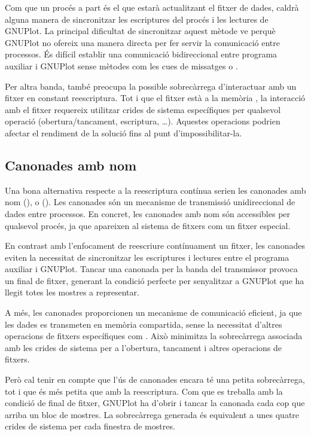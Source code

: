 \documentclass{tfgitic}[2023/07/07]
\begin{document}
Com que un procés a part és el que estarà actualitzant el fitxer de
dades, caldrà alguna manera de sincronitzar les escriptures del procés
i les lectures de GNUPlot. La principal dificultat de sincronitzar
aquest mètode ve perquè GNUPlot no ofereix una manera directa per fer
servir la comunicació entre processos. És difícil establir una
comunicació bidireccional entre programa auxiliar i GNUPlot sense
mètodes com les cues de missatges \cite{cues-missatges} o
  \cite{sockets-unix}.

Per altra banda, també preocupa la possible sobrecàrrega d'interactuar
amb un fitxer en constant reescriptura. Tot i que el fitxer està a la
memòria , la interacció amb el fitxer requereix utilitzar
crides de sistema específiques per qualsevol operació
(obertura/tancament, escriptura, \dots). Aquestes
operacions podrien afectar el rendiment de la solució fins al punt
d'impossibilitar-la.

\subsection{Canonades amb nom}

Una bona alternativa respecte a la reescriptura contínua serien les
canonades amb nom (\cite[]{canonades-nom}), o
 (). Les canonades són un mecanisme
de transmissió unidireccional de dades entre processos. En concret,
les canonades amb nom són accessibles per qualsevol procés, ja que
apareixen al sistema de fitxers com un fitxer especial.

En contrast amb l'enfocament de reescriure contínuament un fitxer, les
canonades eviten la necessitat de sincronitzar les escriptures i
lectures entre el programa auxiliar i GNUPlot. Tancar una canonada per
la banda del transmissor provoca un final de fitxer, generant la
condició perfecte per senyalitzar a GNUPlot que ha llegit totes les
mostres a representar.

A més, les canonades proporcionen un mecanisme de comunicació
eficient, ja que les dades es transmeten en memòria compartida, sense
la necessitat d'altres operacions de fitxers específiques com
. Això minimitza la sobrecàrrega associada amb les crides
de sistema per a l'obertura, tancament i altres operacions de fitxers.

Però cal tenir en compte que l'ús de canonades encara té una petita
sobrecàrrega, tot i que és més petita que amb la reescriptura. Com que
es treballa amb la condició de final de fitxer, GNUPlot ha d'obrir i
tancar la canonada cada cop que arriba un bloc de mostres. La
sobrecàrrega generada és equivalent a unes quatre crides de sistema
per cada finestra de mostres.
\end{document}
